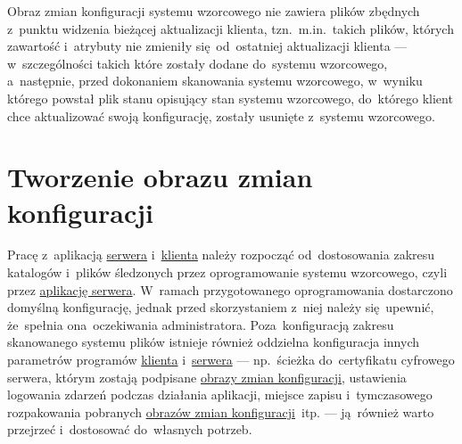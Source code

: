 \documentclass[thesis]{subfiles}
\begin{document}
Obraz zmian konfiguracji systemu wzorcowego nie zawiera plików zbędnych z~punktu widzenia bieżącej aktualizacji klienta, tzn.~m.in.~takich plików, których zawartość i~atrybuty nie zmieniły się~od~ostatniej aktualizacji klienta --- w~szczególności takich które zostały dodane do~systemu wzorcowego, a~następnie, przed dokonaniem skanowania systemu wzorcowego, w~wyniku którego powstał plik stanu opisujący stan systemu wzorcowego, do~którego klient chce aktualizować swoją konfigurację, zostały usunięte z~systemu wzorcowego.


\section{Tworzenie obrazu zmian konfiguracji}
\label{sec:tworzenie-obrazu-konfiguracji}

Pracę z~aplikacją \hyperref[sec:srv-app]{serwera} i~\hyperref[sec:cli-app]{klienta} należy rozpocząć od~dostosowania zakresu katalogów i~plików śledzonych przez oprogramowanie systemu wzorcowego, czyli przez \hyperref[sec:srv-app]{aplikację serwera}. W~ramach przygotowanego oprogramowania dostarczono domyślną konfigurację, jednak przed skorzystaniem z~niej należy się~upewnić, że~spełnia ona~oczekiwania administratora. Poza~konfiguracją zakresu skanowanego systemu plików istnieje również oddzielna konfiguracja innych parametrów programów \hyperref[sec:cli-app]{klienta} i~\hyperref[sec:srv-app]{serwera} --- np.~ścieżka do~certyfikatu cyfrowego serwera, którym zostają podpisane \hyperref[sec:obraz-zmian-konfiguracji]{obrazy zmian konfiguracji}, ustawienia logowania zdarzeń podczas działania aplikacji, miejsce zapisu i~tymczasowego rozpakowania pobranych \hyperref[sec:obraz-zmian-konfiguracji]{obrazów zmian konfiguracji}~itp. --- ją~również warto przejrzeć i~dostosować do~własnych potrzeb.
\end{document}

